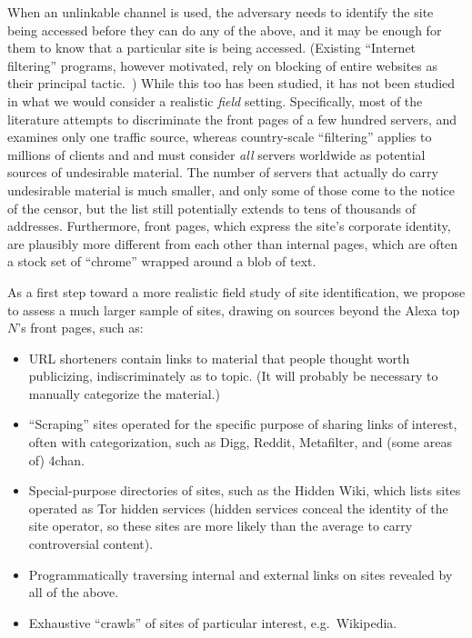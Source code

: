 \documentclass[oneside,tinymargin]{zarticle}
\begin{document}
\begin{multicols}{2}
When an unlinkable channel is used, the adversary needs to identify
the site being accessed before they can do any of the above, and it
may be enough for them to know that a particular site is being
accessed.  (Existing “Internet filtering” programs, however motivated,
rely on blocking of entire websites as their principal
tactic.~\cite{aase2012whiskey}) While this too has been studied, it
has not been studied in what we would consider a realistic
\emph{field} setting.  Specifically, most of the literature attempts
to discriminate the front pages of a few hundred servers, and examines
only one traffic source, whereas country-scale “filtering” applies to
millions of clients and and must consider \emph{all} servers worldwide as
potential sources of undesirable material.  The number of servers that
actually do carry undesirable material is much smaller, and only some
of those come to the notice of the censor, but the list still
potentially extends to tens of thousands of addresses.  Furthermore,
front pages, which express the site's corporate identity, are
plausibly more different from each other than internal pages, which
are often a stock set of “chrome” wrapped around a blob of text.

As a first step toward a more realistic field study of site
identification, we propose to assess a much larger sample of sites,
drawing on sources beyond the Alexa top $N$'s front pages, such as:

\begin{itemize}
\item URL shorteners contain links to material that people thought
  worth publicizing, indiscriminately as to topic.  (It will probably
  be necessary to manually categorize the material.)
\item “Scraping” sites operated for the specific purpose of sharing
  links of interest, often with categorization, such as Digg, Reddit,
  Metafilter, and (some areas of) 4chan.
\item Special-purpose directories of sites, such as the Hidden Wiki,
  which lists sites operated as Tor hidden services (hidden services
  conceal the identity of the site operator, so these sites are more
  likely than the average to carry controversial content).
\item Programmatically traversing internal and external links on sites
  revealed by all of the above.
\item Exhaustive “crawls” of sites of particular interest, e.g.\ Wikipedia.
\end{itemize}


\end{multicols}
\end{document}
